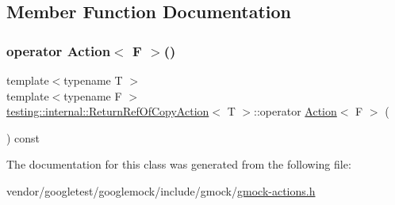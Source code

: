 \subsection{Member Function Documentation}
\mbox{\label{classtesting_1_1internal_1_1_return_ref_of_copy_action_a8b4829fbb46c3ca6468f3eb5c5b42493}} 
\subsubsection{\texorpdfstring{operator Action$<$ F $>$()}{operator Action< F >()}}
{\footnotesize\ttfamily template$<$typename T $>$ \\
template$<$typename F $>$ \\
\hyperlink{classtesting_1_1internal_1_1_return_ref_of_copy_action}{testing\+::internal\+::\+Return\+Ref\+Of\+Copy\+Action}$<$ T $>$\+::operator \hyperlink{classtesting_1_1_action}{Action}$<$ F $>$ (\begin{DoxyParamCaption}{ }\end{DoxyParamCaption}) const\hspace{0.3cm}{\ttfamily [inline]}}



The documentation for this class was generated from the following file\+:\begin{DoxyCompactItemize}
\item 
vendor/googletest/googlemock/include/gmock/\hyperlink{gmock-actions_8h}{gmock-\/actions.\+h}\end{DoxyCompactItemize}
